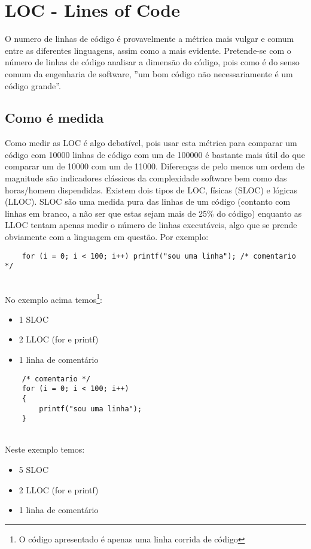 \documentclass[a4paper,10pt,openright,openbib,twocolumn]{article}
\begin{document}
\section{LOC - Lines of Code}

O numero de linhas de código é provavelmente a métrica mais vulgar e comum entre as diferentes linguagens, assim como a mais evidente. Pretende-se com o número de linhas de código analisar a dimensão do código, pois como é do senso comum da engenharia de software, ”um bom código não necessariamente é um código grande”.

\subsection{Como é medida}

Como medir as LOC é algo debatível, pois usar esta métrica para comparar um código com 10000 linhas de código com um de 100000 é bastante mais útil do que comparar um de 10000 com um de 11000. Diferenças de pelo menos um ordem de magnitude são indicadores clássicos da complexidade software bem como das horas/homem dispendidas. Existem dois tipos de LOC, físicas (SLOC) e lógicas (LLOC). SLOC são uma medida pura das linhas de um código (contanto com linhas em branco, a não ser que estas sejam mais de 25\% do código) enquanto as LLOC tentam apenas medir o número de linhas executáveis, algo que se prende obviamente com a linguagem em questão. Por exemplo:

\begin{minipage}{.47\textwidth}
\lstset{
    language=C,
    basicstyle=\ttfamily\small,
    breaklines=true
}
\begin{lstlisting}
    for (i = 0; i < 100; i++) printf("sou uma linha"); /* comentario */
\end{lstlisting}
\end{minipage}
\\No exemplo acima temos\footnote{O código apresentado é apenas uma linha corrida de código}:
\begin{itemize}
	\item 1 SLOC
	\item 2 LLOC (for e printf)
	\item 1 linha de comentário
\end{itemize}



\begin{minipage}{.47\textwidth}
\lstset{
    language=C,
    basicstyle=\ttfamily\small,
    breaklines=true
}
\begin{lstlisting}
	/* comentario */
    for (i = 0; i < 100; i++) 
    {
    	printf("sou uma linha"); 
    }    
\end{lstlisting}
\end{minipage}
\\Neste exemplo temos:
\begin{itemize}
	\item 5 SLOC 
	\item 2 LLOC (for e printf)
	\item 1 linha de comentário
\end{itemize}
\end{document}
